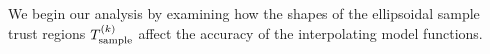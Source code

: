 \documentclass{article}
\begin{document}
We begin our analysis by examining how the shapes of the ellipsoidal sample trust regions ${T_{\text{sample}}^{(k)}}$ affect the accuracy of the interpolating model functions.   



%
%
%
%
%
\end{document}
